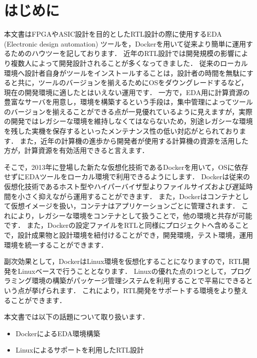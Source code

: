 \section{はじめに}

本文書はFPGAやASIC設計を目的としたRTL設計の際に使用するEDA (Electronic design automation) ツールを，Dockerを用いて従来より簡単に運用するためのハウツーを記しております．
近年のRTL設計では開発規模の影響により複数人によって開発設計されることが多くなってきました．
従来のローカル環境へ設計者自身がツールをインストールすることは，設計者の時間を無駄にすると共に，ツールのバージョンを揃えるためにOSをダウングレードするなど，現在の開発環境に適したとはいえない運用です．
一方で，EDA用に計算資源の豊富なサーバを用意し，環境を構築するという手段は，集中管理によってツールのバージョンを揃えることができる点が一見優れているように見えますが，実際の開発ではレガシーな環境を維持しなくてはならないため，別途レガシーな環境を残した実機を保存するといったメンテナンス性の低い対応がとられております．
また，近年の計算機の進歩から開発者が使用する計算機の資源を活用した方が，計算資源を有効活用できると言えます．

そこで，2013年に登場した新たな仮想化技術であるDockerを用いて，OSに依存せずにEDAツールをローカル環境で利用できるようにします．
Dockerは従来の仮想化技術であるホスト型やハイパーバイザ型よりファイルサイズおよび遅延時間を小さく抑えながら運用することができます．
また，Dockerはコンテナとして仮想イメージを扱い，コンテナはアプリケーションごとに管理されます．
これにより，レガシーな環境をコンテナとして扱うことで，他の環境と共存が可能です．
また，Dockerの設定ファイルをRTLと同様にプロジェクトへ含めることで，設計成果物と設計環境を紐付けることができ，開発環境，テスト環境，運用環境を統一することができます．

副次効果として，DockerはLinux環境を仮想化することになりますので，RTL開発をLinuxベースで行うこととなります．
Linuxの優れた点の1つとして，プログラミング環境の構築がパッケージ管理システムを利用することで平易にできるという点が挙げられます．
これにより，RTL開発をサポートする環境をより整えることができます．

本文書では以下の話題について取り扱います．

\begin{itemize}
  \item DockerによるEDA環境構築
  \item Linuxによるサポートを利用したRTL設計
\end{itemize}
